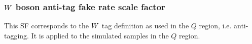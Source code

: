 \subsubsection{\texorpdfstring{$W$}{W} boson anti-tag fake rate scale factor
\label{sec:wantitag_fake_sf}}

This SF corresponds to the $W$ tag
definition as used in the $Q$ region, i.e. anti-tagging. It is applied to the simulated samples in
the $Q$ region.




% 
% 
% 

